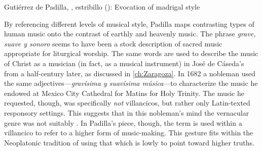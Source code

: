\begin{musicexample}
    \caption{Gutiérrez de Padilla, , estribillo
    (): Evocation of madrigal style}

    \label{music:Padilla-Voces-madrigal}

\end{musicexample}

By referencing different levels of musical style, Padilla maps contrasting types
of human music onto the contrast of earthly and heavenly music.
The phrase \emph{grave, suave y sonoro} seems to have been a stock description
of sacred music appropriate for liturgical worship.%
    \Autocite
    [On \emph{suave} and other common vocabulary used to evoke music in Spanish
    poetry of the period, see][]{UribeBracho:OrfeoPhD}
The same words are used to describe the music of Christ as a musician (in fact,
as a musical instrument) in José de Cáseda's  from a
half-century later, as discussed in \cref{ch:Zaragoza}.
In 1682 a nobleman used the same adjectives---\emph{gravísima y suavísima
música}---to characterize the music he endowed at Mexico City Cathedral for
Matins for Holy Trinity.%
    \Autocite[140--141]{Goldman:Responsory}
The music he requested, though, was specifically \emph{not} villancicos, but
rather only Latin-texted responsory settings.
This suggests that in this nobleman's mind the vernacular genre was not suitably
.
In Padilla's piece, though, the term is used within a villancico to refer to a
higher form of music-making. 
This gesture fits within the Neoplatonic tradition of using that which is lowly
to point toward higher truths.

